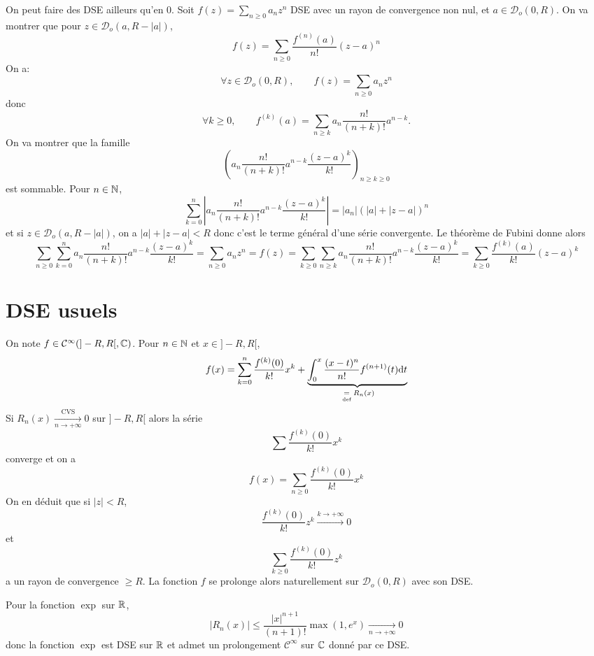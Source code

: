 \begin{rem}
    On peut faire des DSE ailleurs qu'en $0$. Soit $f(z)=\sum_{n\geq 0}a_nz^n$ DSE avec un rayon de convergence non nul, et $a\in\mathcal D_o(0, R)$. On va montrer que pour $z\in\mathcal D_o(a, R-|a|)$, \[
        f(z)=\sum_{n\geq 0}\frac{f^{(n)}(a)}{n!}(z-a)^n
    \]
    On a: \[
        \forall z\in\mathcal D_o(0, R), \qquad f(z)=\sum_{n\geq 0}a_nz^n
    \]
    donc \[\forall k\geq 0, \qquad f^{(k)}(a)=\sum_{n\geq k}a_n\frac{n!}{(n+k)!}a^{n-k}.\]
    On va montrer que la famille \[
        \left( a_n\frac{n!}{(n+k)!}a^{n-k}\frac{(z-a)^k}{k!} \right)_{n\geq k\geq 0}
    \]
    est sommable. Pour $n\in\mathbb N$, \[
        \sum_{k=0}^n \left| a_n\frac{n!}{(n+k)!}a^{n-k}\frac{(z-a)^k}{k!} \right|=|a_n|(|a|+|z-a|)^n
    \]
    et si $z\in\mathcal D_o(a, R-|a|)$, on a $|a|+|z-a|<R$ donc c'est le terme général d'une série convergente. Le théorème de Fubini donne alors \[
        \sum_{n\geq 0}\sum_{k=0}^na_n\frac{n!}{(n+k)!}a^{n-k}\frac{(z-a)^k}{k!}=\sum_{n\geq 0}a_nz^n=f(z)=\sum_{k\geq 0}\sum_{n\geq k}a_n\frac{n!}{(n+k)!}a^{n-k}\frac{(z-a)^k}{k!}=\sum_{k\geq 0}\frac{f^{(k)}(a)}{k!}(z-a)^k
    \]
\end{rem}

\section{DSE usuels}

\begin{rem}
    On note $f\in\mathcal C^\infty(]-R, R[, \mathbb C)$. Pour $n\in\mathbb N$ et $x\in ]-R, R[$, \[
        f(x)=\sum_{k=0}^n\frac{f^{(k)}(0)}{k!}x^k+\underbrace{\int_0^x\frac{(x-t)^n}{n!}f^{(n+1)}(t)\mathrm{d} t}_{\;\underset{\text{def}}=\; R_n(x)}
    \]
    Si $R_n(x)\xrightarrow[n\to+\infty]{\text{CVS}}0$ sur $]-R, R[$ alors la série \[
        \sum \frac{f^{(k)}(0)}{k!}x^k
    \]
    converge et on a \[
        f(x)=\sum_{n\geq 0} \frac{f^{(k)}(0)}{k!}x^k
    \]
    On en déduit que si $|z|<R$, \[
        \frac{f^{(k)}(0)}{k!}z^k\xrightarrow{k\to+\infty}0
    \]
    et \[
        \sum_{k\geq 0}\frac{f^{(k)}(0)}{k!}z^k
    \]
    a un rayon de convergence $\geq R$. La fonction $f$ se prolonge alors naturellement sur $\mathcal D_o(0, R)$ avec son DSE.
\end{rem}

\begin{ex}
    Pour la fonction $\exp$ sur $\mathbb R$, \[
        \left| R_n(x) \right|\leq \frac{|x|^{n+1}}{(n+1)!}\max(1, e^x)\xrightarrow[n\to+\infty]{}0
    \]
    donc la fonction $\exp$ est DSE sur $\mathbb R$ et admet un prolongement $\mathcal C^\infty$ sur $\mathbb C$ donné par ce DSE.
\end{ex}


